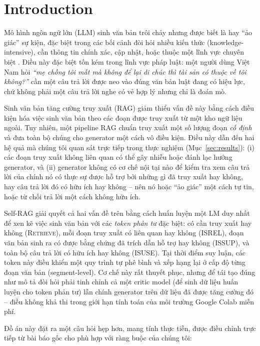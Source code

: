 \documentclass[11pt]{article}
\begin{document}
\section{Introduction}
\label{sec:intro}

Mô hình ngôn ngữ lớn (LLM) sinh văn bản trôi chảy nhưng được biết là hay ``ảo giác'' sự kiện, đặc biệt trong các bối cảnh đòi hỏi nhiều kiến thức (knowledge-intensive), cần thông tin chính xác, cập nhật, hoặc thuộc một lĩnh vực chuyên biệt \citep{brown2020language,ji2023survey}. Điều này đặc biệt tốn kém trong lĩnh vực pháp luật: một người dùng Việt Nam hỏi \emph{``mẹ chồng tôi mất mà không để lại di chúc thì tài sản có thuộc về tôi không?''} cần một câu trả lời được neo vào đúng văn bản luật đang có hiệu lực, chứ không phải một câu trả lời nghe có vẻ hợp lý nhưng chỉ là đoán mò.

Sinh văn bản tăng cường truy xuất (RAG) \citep{lewis2020retrieval} giảm thiểu vấn đề này bằng cách điều kiện hóa việc sinh văn bản theo các đoạn được truy xuất từ một kho ngữ liệu ngoài. Tuy nhiên, một pipeline RAG chuẩn truy xuất một số lượng đoạn \emph{cố định} và đưa toàn bộ chúng cho generator một cách vô điều kiện. Điều này dẫn đến hai hệ quả mà chúng tôi quan sát trực tiếp trong thực nghiệm (Mục~\ref{sec:results}): (i) các đoạn truy xuất không liên quan có thể gây nhiễu hoặc đánh lạc hướng generator, và (ii) generator không có cơ chế nội tại nào để kiểm tra xem câu trả lời của chính nó có thực sự được hỗ trợ bởi những gì đã truy xuất hay không, hay câu trả lời đó có hữu ích hay không -- nên nó hoặc ``ảo giác'' một cách tự tin, hoặc từ chối trả lời một cách không hữu ích.

Self-RAG \citep{asai2024selfrag} giải quyết cả hai vấn đề trên bằng cách huấn luyện một LM duy nhất để xen kẽ việc sinh văn bản với các \emph{token phản tư} đặc biệt: có cần truy xuất hay không (\textsc{Retrieve}), mỗi đoạn truy xuất có liên quan hay không (\textsc{ISREL}), đoạn văn bản sinh ra có được bằng chứng đã trích dẫn hỗ trợ hay không (\textsc{ISSUP}), và toàn bộ câu trả lời có hữu ích hay không (\textsc{ISUSE}). Tại thời điểm suy luận, các token này điều khiển một quy trình tự phê bình và xếp hạng lại ở cấp độ từng đoạn văn bản (segment-level). Cơ chế này rất thuyết phục, nhưng để tái tạo đúng như mô tả đòi hỏi phải tinh chỉnh cả một critic model (để sinh dữ liệu huấn luyện cho token phản tư) lẫn chính generator trên dữ liệu đã được tăng cường đó -- điều không khả thi trong giới hạn tính toán của môi trường Google Colab miễn phí.

Đồ án này đặt ra một câu hỏi hẹp hơn, mang tính thực tiễn, được điều chỉnh trực tiếp từ bài báo gốc cho phù hợp với ràng buộc của chúng tôi:
\end{document}
